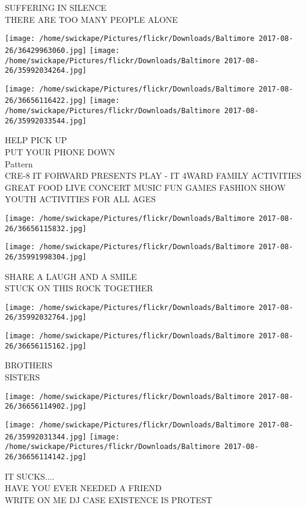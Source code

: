 \documentclass[10pt,letterpaper]{article}
\begin{document}
SUFFERING IN SILENCE\\
THERE ARE TOO MANY PEOPLE ALONE
\pagebreak

\texttt{[image: /home/swickape/Pictures/flickr/Downloads/Baltimore 2017-08-26/36429963060.jpg]}
\texttt{[image: /home/swickape/Pictures/flickr/Downloads/Baltimore 2017-08-26/35992034264.jpg]}

\texttt{[image: /home/swickape/Pictures/flickr/Downloads/Baltimore 2017-08-26/36656116422.jpg]}
\texttt{[image: /home/swickape/Pictures/flickr/Downloads/Baltimore 2017-08-26/35992033544.jpg]}

HELP PICK UP\\
PUT YOUR PHONE DOWN\\
Pattern\\
CRE{-}8 IT FORWARD PRESENTS PLAY {-} IT 4WARD FAMILY ACTIVITIES GREAT FOOD LIVE CONCERT MUSIC FUN GAMES FASHION SHOW YOUTH ACTIVITIES FOR ALL AGES
\pagebreak

\texttt{[image: /home/swickape/Pictures/flickr/Downloads/Baltimore 2017-08-26/36656115832.jpg]}

\vspace{0.25in}
\texttt{[image: /home/swickape/Pictures/flickr/Downloads/Baltimore 2017-08-26/35991998304.jpg]}

SHARE A LAUGH AND A SMILE\\
STUCK ON THIS ROCK TOGETHER
\pagebreak

\texttt{[image: /home/swickape/Pictures/flickr/Downloads/Baltimore 2017-08-26/35992032764.jpg]}

\vspace{0.25in}
\texttt{[image: /home/swickape/Pictures/flickr/Downloads/Baltimore 2017-08-26/36656115162.jpg]}

BROTHERS\\
SISTERS
\pagebreak

\texttt{[image: /home/swickape/Pictures/flickr/Downloads/Baltimore 2017-08-26/36656114902.jpg]}

\vspace{0.25in}
\texttt{[image: /home/swickape/Pictures/flickr/Downloads/Baltimore 2017-08-26/35992031344.jpg]}
\texttt{[image: /home/swickape/Pictures/flickr/Downloads/Baltimore 2017-08-26/36656114142.jpg]}

IT SUCKS....\\
HAVE YOU EVER NEEDED A FRIEND\\
WRITE ON ME DJ CASE EXISTENCE IS PROTEST
\pagebreak
\end{document}
